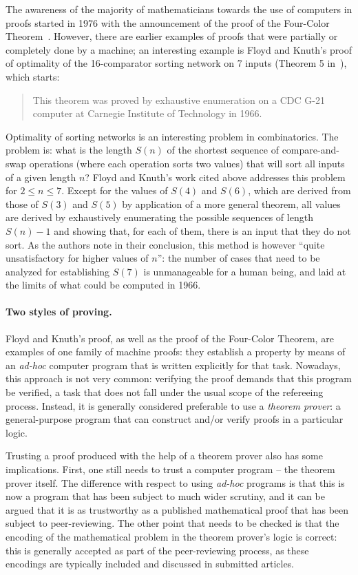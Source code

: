 The awareness of the majority of mathematicians towards the use of computers in
proofs started in 1976 with the announcement of the proof of the Four-Color
Theorem~\cite{AppelHaken1976a}. However, there are earlier examples of proofs
that were partially or completely done by a machine; an interesting example is
Floyd and Knuth's proof of optimality of the 16-comparator sorting network on 7
inputs (Theorem 5 in~\cite{FloydKnuth1973}), which starts:
\begin{quote}
This theorem was proved by exhaustive enumeration on a CDC G-21 computer at
Carnegie Institute of Technology in 1966.
\end{quote}

Optimality of sorting networks is an interesting problem in combinatorics. The
problem is: what is the length $S(n)$ of the shortest sequence of
compare-and-swap operations (where each operation sorts two values) that will
sort all inputs of a given length $n$?
Floyd and Knuth's work cited above addresses this problem for $2\leq n\leq 7$.
Except for the values of $S(4)$ and $S(6)$, which are derived from those of
$S(3)$ and $S(5)$ by application of a more general theorem, all values are
derived by exhaustively enumerating the possible sequences of length $S(n)-1$
and showing that, for each of them, there is an input that they do not sort.
As the authors note in their conclusion, this method is however ``quite
unsatisfactory for higher values of $n$'': the number of cases that need to be
analyzed for establishing $S(7)$ is unmanageable for a human being, and laid at
the limits of what could be computed in 1966.

\paragraph{Two styles of proving.}

Floyd and Knuth's proof, as well as the proof of the Four-Color Theorem, are
examples of one family of machine proofs: they establish a property by means of
an \emph{ad-hoc} computer program that is written explicitly for that task.
Nowadays, this approach is not very common: verifying the proof demands that
this program be verified, a task that does not fall under the usual scope of the
refereeing process. Instead, it is generally considered preferable to use a
\emph{theorem prover}: a general-purpose program that can construct and/or
verify proofs in a particular logic.

Trusting a proof produced with the help of a theorem prover also has some
implications. First, one still needs to trust a computer program -- the theorem
prover itself. The difference with respect to using \emph{ad-hoc} programs is
that this is now a program that has been subject to much wider scrutiny, and it
can be argued that it is as trustworthy as a published mathematical proof that
has been subject to peer-reviewing. The other point that needs to be checked is
that the encoding of the mathematical problem in the theorem prover's logic is
correct: this is generally accepted as part of the peer-reviewing process, as
these encodings are typically included and discussed in submitted articles.

